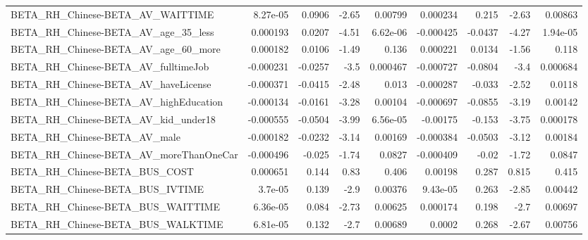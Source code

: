 \begin{tabular}{lrrrrrrrr}
BETA\_RH\_Chinese-BETA\_AV\_WAITTIME                   &    8.27e-05 &       0.0906 &    -2.65 &  0.00799 &   0.000234 &       0.215 &        -2.63 &       0.00863 \\
BETA\_RH\_Chinese-BETA\_AV\_age\_35\_less                &    0.000193 &       0.0207 &    -4.51 & 6.62e-06 &  -0.000425 &     -0.0437 &        -4.27 &      1.94e-05 \\
BETA\_RH\_Chinese-BETA\_AV\_age\_60\_more                &    0.000182 &       0.0106 &    -1.49 &    0.136 &   0.000221 &      0.0134 &        -1.56 &         0.118 \\
BETA\_RH\_Chinese-BETA\_AV\_fulltimeJob                &   -0.000231 &      -0.0257 &     -3.5 & 0.000467 &  -0.000727 &     -0.0804 &         -3.4 &      0.000684 \\
BETA\_RH\_Chinese-BETA\_AV\_haveLicense                &   -0.000371 &      -0.0415 &    -2.48 &    0.013 &  -0.000287 &      -0.033 &        -2.52 &        0.0118 \\
BETA\_RH\_Chinese-BETA\_AV\_highEducation              &   -0.000134 &      -0.0161 &    -3.28 &  0.00104 &  -0.000697 &     -0.0855 &        -3.19 &       0.00142 \\
BETA\_RH\_Chinese-BETA\_AV\_kid\_under18                &   -0.000555 &      -0.0504 &    -3.99 & 6.56e-05 &   -0.00175 &      -0.153 &        -3.75 &      0.000178 \\
BETA\_RH\_Chinese-BETA\_AV\_male                       &   -0.000182 &      -0.0232 &    -3.14 &  0.00169 &  -0.000384 &     -0.0503 &        -3.12 &       0.00184 \\
BETA\_RH\_Chinese-BETA\_AV\_moreThanOneCar             &   -0.000496 &       -0.025 &    -1.74 &   0.0827 &  -0.000409 &       -0.02 &        -1.72 &        0.0847 \\
BETA\_RH\_Chinese-BETA\_BUS\_COST                      &    0.000651 &        0.144 &     0.83 &    0.406 &    0.00198 &       0.287 &        0.815 &         0.415 \\
BETA\_RH\_Chinese-BETA\_BUS\_IVTIME                    &     3.7e-05 &        0.139 &     -2.9 &  0.00376 &   9.43e-05 &       0.263 &        -2.85 &       0.00442 \\
BETA\_RH\_Chinese-BETA\_BUS\_WAITTIME                  &    6.36e-05 &        0.084 &    -2.73 &  0.00625 &   0.000174 &       0.198 &         -2.7 &       0.00697 \\
BETA\_RH\_Chinese-BETA\_BUS\_WALKTIME                  &    6.81e-05 &        0.132 &     -2.7 &  0.00689 &     0.0002 &       0.268 &        -2.67 &       0.00756 \\

\end{tabular}
